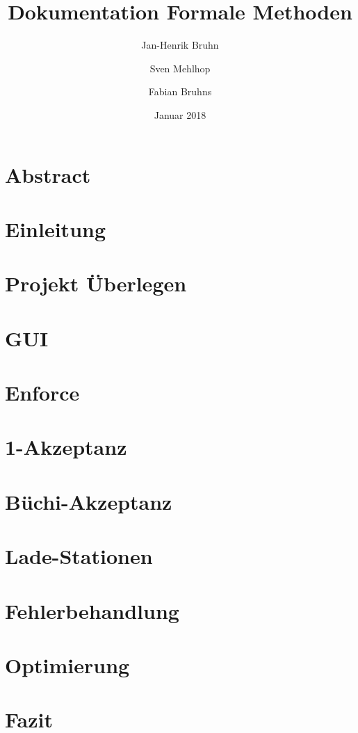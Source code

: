\documentclass{article}
\title{Dokumentation Formale Methoden}
\author{Jan-Henrik Bruhn \and Sven Mehlhop \and Fabian Bruhns}
\date{Januar 2018}
\begin{document}
\maketitle
\tableofcontents


\section{Abstract}
\section{Einleitung}
\section{Projekt Überlegen}
\section{GUI}
\section{Enforce}
\section{1-Akzeptanz}
\section{Büchi-Akzeptanz}
\section{Lade-Stationen}
\section{Fehlerbehandlung}
\section{Optimierung}
\section{Fazit}


\end{document}

